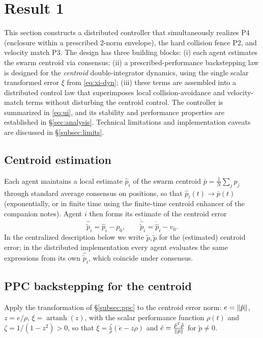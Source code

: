 \section{Result 1}
\label{sec:design}

This section constructs a distributed controller that simultaneously realizes
P4 (enclosure within a prescribed 2-norm envelope), the hard collision fence
P2, and velocity match P3. The design has three building blocks: (i) each
agent estimates the swarm centroid via consensus; (ii) a prescribed-performance
backstepping law is designed for the \emph{centroid} double-integrator
dynamics, using the single scalar transformed error $\xi$ from
\eqref{eq:xi-dyn}; (iii) these terms are assembled into a distributed control
law that superimposes local collision-avoidance and velocity-match terms
without disturbing the centroid control. The controller is summarized in
\eqref{eq:ui}, and its stability and performance properties are established
in \S\ref{sec:analysis}.  Technical limitations and implementation caveats
are discussed in \S\ref{subsec:limits}.

\subsection{Centroid estimation}
\label{subsec:consensus}

Each agent maintains a local estimate $\hat p_i$ of the swarm centroid
$\bar p=\frac1N\sum_j p_j$ through standard average consensus on positions,
so that $\hat p_i(t)\to \bar p(t)$ (exponentially, or in finite time using
the finite-time centroid enhancer of the companion notes). Agent $i$ then
forms its estimate of the centroid error
\[
\hat{\tilde p}_i = \hat p_i - p_0, \qquad
\dot{\hat{\tilde p}}_i = \dot{\hat p}_i - v_0.
\]
In the centralized description below we write $\tilde p,\dot{\tilde p}$ for
the (estimated) centroid error; in the distributed implementation every
agent evaluates the same expressions from its own $\hat{\tilde p}_i$, which
coincide under consensus.

\subsection{PPC backstepping for the centroid}
\label{subsec:ppc-design}

Apply the transformation of \S\ref{subsec:ppc} to the centroid error norm:
$e=\lVert \tilde p \rVert$, $z=e/\rho$, $\xi=\operatorname{artanh}(z)$,
with the scalar performance function $\rho(t)$ and
$\zeta=1/(1-z^2)>0$, so that
$\dot\xi = \frac{\zeta}{\rho}(\dot e - z\dot\rho)$ and
$\dot e = \frac{\tilde p^T\dot{\tilde p}}{\lVert \tilde p \rVert}$ for
$\tilde p\neq0$.

